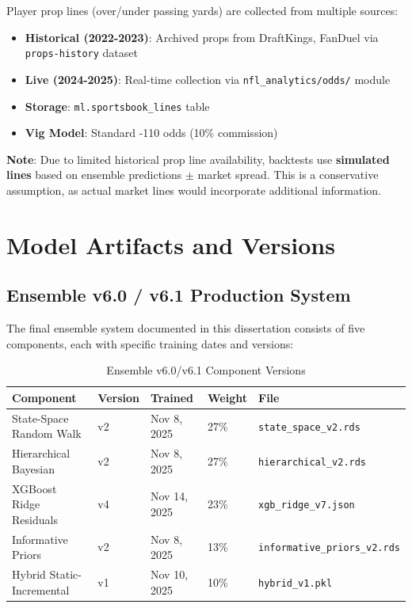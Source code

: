 Player prop lines (over/under passing yards) are collected from multiple sources:

\begin{itemize}
    \item \textbf{Historical (2022-2023)}: Archived props from DraftKings, FanDuel via \texttt{props-history} dataset
    \item \textbf{Live (2024-2025)}: Real-time collection via \texttt{nfl\_analytics/odds/} module
    \item \textbf{Storage}: \texttt{ml.sportsbook\_lines} table
    \item \textbf{Vig Model}: Standard -110 odds (10\% commission)
\end{itemize}

\textbf{Note}: Due to limited historical prop line availability, backtests use \textbf{simulated lines} based on ensemble predictions $\pm$ market spread. This is a conservative assumption, as actual market lines would incorporate additional information.

\section{Model Artifacts and Versions}

\subsection{Ensemble v6.0 / v6.1 Production System}

The final ensemble system documented in this dissertation consists of five components, each with specific training dates and versions:

\begin{table}[htbp]
\centering
\caption{Ensemble v6.0/v6.1 Component Versions}
\label{tab:model-versions}
\begin{tabular}{@{}lllll@{}}
\toprule
\textbf{Component} & \textbf{Version} & \textbf{Trained} & \textbf{Weight} & \textbf{File} \\ \midrule
State-Space Random Walk & v2 & Nov 8, 2025 & 27\% & \texttt{state\_space\_v2.rds} \\
Hierarchical Bayesian & v2 & Nov 8, 2025 & 27\% & \texttt{hierarchical\_v2.rds} \\
XGBoost Ridge Residuals & v4 & Nov 14, 2025 & 23\% & \texttt{xgb\_ridge\_v7.json} \\
Informative Priors & v2 & Nov 8, 2025 & 13\% & \texttt{informative\_priors\_v2.rds} \\
Hybrid Static-Incremental & v1 & Nov 10, 2025 & 10\% & \texttt{hybrid\_v1.pkl} \\ \bottomrule
\end{tabular}
\end{table}

